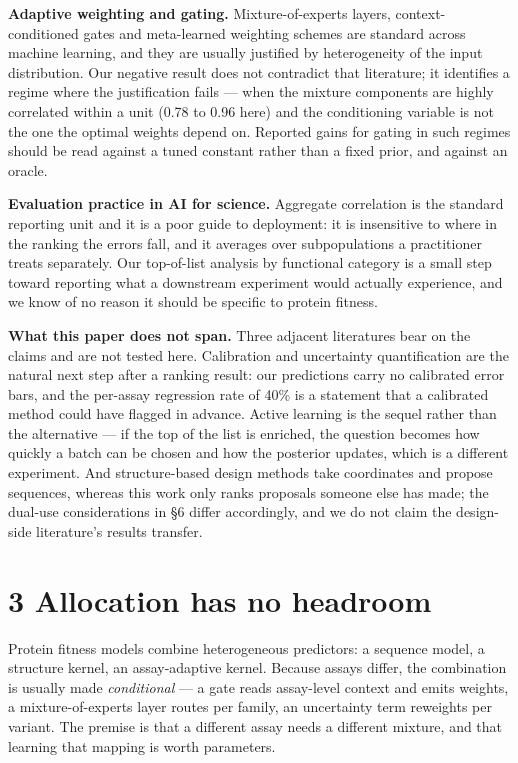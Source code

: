 \documentclass[sigconf,review,nonacm]{acmart}
\begin{document}
\textbf{Adaptive weighting and gating.} Mixture-of-experts layers, context-conditioned gates and meta-learned
weighting schemes are standard across machine learning, and they are usually justified by heterogeneity
of the input distribution. Our negative result does not contradict that literature; it identifies a
regime where the justification fails --- when the mixture components are highly correlated within a unit
(0.78 to 0.96 here) and the conditioning variable is not the one the optimal weights depend on. Reported
gains for gating in such regimes should be read against a tuned constant rather than a fixed prior, and
against an oracle.

\textbf{Evaluation practice in AI for science.} Aggregate correlation is the standard reporting unit and it
is a poor guide to deployment: it is insensitive to where in the ranking the errors fall, and it
averages over subpopulations a practitioner treats separately. Our top-of-list analysis by functional
category is a small step toward reporting what a downstream experiment would actually experience, and we
know of no reason it should be specific to protein fitness.

\textbf{What this paper does not span.} Three adjacent literatures bear on the claims and are not tested
here. Calibration and uncertainty quantification are the natural next step after a ranking result: our
predictions carry no calibrated error bars, and the per-assay regression rate of 40\% is a statement that
a calibrated method could have flagged in advance. Active learning is the sequel rather than the
alternative --- if the top of the list is enriched, the question becomes how quickly a batch can be chosen
and how the posterior updates, which is a different experiment. And structure-based design methods take
coordinates and propose sequences, whereas this work only ranks proposals someone else has made; the
dual-use considerations in §6 differ accordingly, and we do not claim the design-side literature's
results transfer.

\hypertarget{allocation-has-no-headroom}{%
\section{3 Allocation has no headroom}\label{allocation-has-no-headroom}}

Protein fitness models combine heterogeneous predictors: a sequence model, a structure kernel, an
assay-adaptive kernel. Because assays differ, the combination is usually made \emph{conditional} --- a gate
reads assay-level context and emits weights, a mixture-of-experts layer routes per family, an
uncertainty term reweights per variant. The premise is that a different assay needs a different
mixture, and that learning that mapping is worth parameters.
\end{document}
